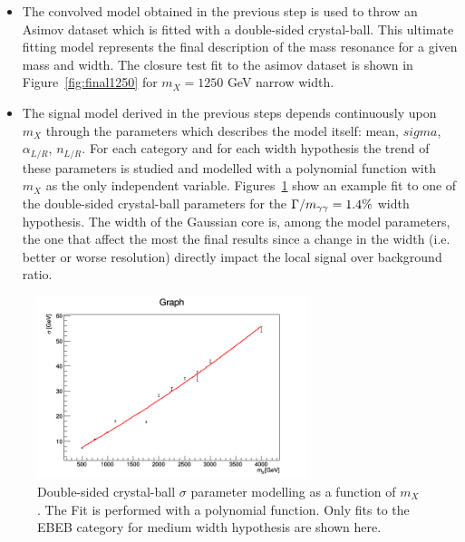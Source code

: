 \begin{itemize}
\item The convolved model obtained in the previous step is used to throw an Asimov dataset which is fitted with a double-sided crystal-ball. This ultimate fitting model represents the final description of the mass resonance for a given mass and width. The closure test fit to the asimov dataset is shown in Figure~\ref{fig:final1250} for $m_X=1250$ GeV  narrow width.

\item The signal model derived in the previous steps depends continuously upon  $m_X$ through the parameters which describes the model itself: mean, $sigma$, $\alpha_{L/R}$, $n_{L/R}$. For each category and for each width hypothesis the trend of these parameters is studied and modelled with a polynomial function with $m_X$ as the only independent variable. Figures~\ref{fig:fitmean} show an example fit to one of the  double-sided crystal-ball parameters for the $\Gamma / m_{\gamma\gamma} = 1.4\%$ width hypothesis. The width of the Gaussian core is, among the model parameters, the one that affect the most the final results since
  a change in the width (i.e. better or worse resolution) directly impact the local signal over background ratio.

\end{itemize}
  
\begin{figure}[!h]
\begin{center}
  \includegraphics[width=0.7\textwidth]{figures/diphotons/sigmaVsMass_EBEB016.png}
 \caption{Double-sided crystal-ball $\sigma$ parameter modelling as a function of $m_X$. The Fit is performed with a polynomial function. Only fits to the EBEB category for medium width hypothesis are shown here.}
\label{fig:fitmean}
\end{center}
\end{figure}

